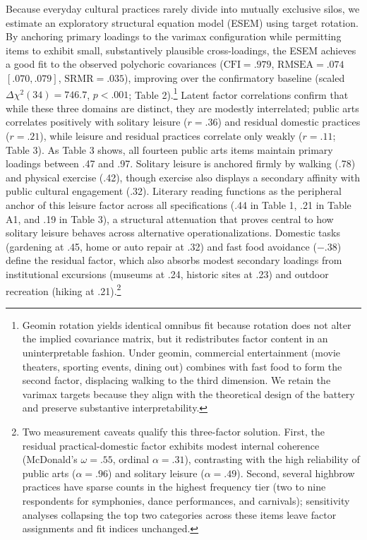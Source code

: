 \documentclass[
  12pt
]{article}
\begin{document}
Because everyday cultural practices rarely divide into mutually exclusive silos, we estimate an exploratory structural equation model (ESEM) using target rotation. By anchoring primary loadings to the varimax configuration while permitting items to exhibit small, substantively plausible cross-loadings, the ESEM achieves a good fit to the observed polychoric covariances ($\text{CFI} = .979$, $\text{RMSEA} = .074$ $[.070, .079]$, $\text{SRMR} = .035$), improving over the confirmatory baseline (scaled $\Delta\chi^2(34) = 746.7$, $p < .001$; Table 2).\footnote{Geomin rotation yields identical omnibus fit because rotation does not alter the implied covariance matrix, but it redistributes factor content in an uninterpretable fashion. Under geomin, commercial entertainment (movie theaters, sporting events, dining out) combines with fast food to form the second factor, displacing walking to the third dimension. We retain the varimax targets because they align with the theoretical design of the battery and preserve substantive interpretability.} Latent factor correlations confirm that while these three domains are distinct, they are modestly interrelated; public arts correlates positively with solitary leisure ($r = .36$) and residual domestic practices ($r = .21$), while leisure and residual practices correlate only weakly ($r = .11$; Table 3). As Table 3 shows, all fourteen public arts items maintain primary loadings between .47 and .97. Solitary leisure is anchored firmly by walking (.78) and physical exercise (.42), though exercise also displays a secondary affinity with public cultural engagement (.32). Literary reading functions as the peripheral anchor of this leisure factor across all specifications (.44 in Table 1, .21 in Table A1, and .19 in Table 3), a structural attenuation that proves central to how solitary leisure behaves across alternative operationalizations. Domestic tasks (gardening at .45, home or auto repair at .32) and fast food avoidance ($-.38$) define the residual factor, which also absorbs modest secondary loadings from institutional excursions (museums at .24, historic sites at .23) and outdoor recreation (hiking at .21).\footnote{Two measurement caveats qualify this three-factor solution. First, the residual practical-domestic factor exhibits modest internal coherence (McDonald's $\omega = .55$, ordinal $\alpha = .31$), contrasting with the high reliability of public arts ($\alpha = .96$) and solitary leisure ($\alpha = .49$). Second, several highbrow practices have sparse counts in the highest frequency tier (two to nine respondents for symphonies, dance performances, and carnivals); sensitivity analyses collapsing the top two categories across these items leave factor assignments and fit indices unchanged.}
\end{document}
